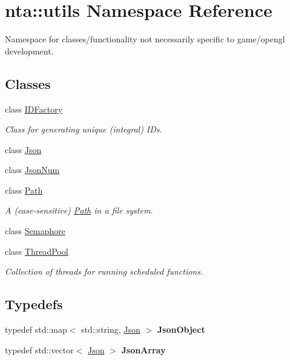 \hypertarget{namespacenta_1_1utils}{}\section{nta\+:\+:utils Namespace Reference}
\label{namespacenta_1_1utils}


Namespace for classes/functionality not necessarily specific to game/opengl development.  


\subsection*{Classes}
\begin{DoxyCompactItemize}
\item 
class \hyperlink{classnta_1_1utils_1_1IDFactory}{I\+D\+Factory}
\begin{DoxyCompactList}\small\item\em Class for generating unique (integral) I\+Ds. \end{DoxyCompactList}\item 
class \hyperlink{classnta_1_1utils_1_1Json}{Json}
\item 
class \hyperlink{classnta_1_1utils_1_1JsonNum}{Json\+Num}
\item 
class \hyperlink{classnta_1_1utils_1_1Path}{Path}
\begin{DoxyCompactList}\small\item\em A (case-\/sensitive) \hyperlink{classnta_1_1utils_1_1Path}{Path} in a file system. \end{DoxyCompactList}\item 
class \hyperlink{classnta_1_1utils_1_1Semaphore}{Semaphore}
\item 
class \hyperlink{classnta_1_1utils_1_1ThreadPool}{Thread\+Pool}
\begin{DoxyCompactList}\small\item\em Collection of threads for running scheduled functions. \end{DoxyCompactList}\end{DoxyCompactItemize}
\subsection*{Typedefs}
\begin{DoxyCompactItemize}
\item 
\mbox{\label{namespacenta_1_1utils_aacec41f909698427351bd2d4e6bfb0ff}} 
typedef std\+::map$<$ std\+::string, \hyperlink{classnta_1_1utils_1_1Json}{Json} $>$ {\bfseries Json\+Object}
\item 
\mbox{\label{namespacenta_1_1utils_a016ff68f749b52514dae354976f110ea}} 
typedef std\+::vector$<$ \hyperlink{classnta_1_1utils_1_1Json}{Json} $>$ {\bfseries Json\+Array}
\end{DoxyCompactItemize}
